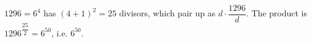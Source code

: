 $1296=6^4$ has $(4+1)^2=25$ divisors, which pair up as $d\cdot\dfrac{1296}d$. The product is $1296^{\dfrac{25}2}=6^{50}$, i.e. $\boxed{6^{50}}$.
